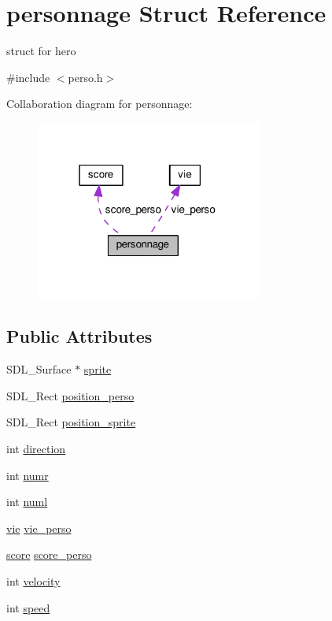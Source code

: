 \hypertarget{structpersonnage}{}\section{personnage Struct Reference}
\label{structpersonnage}


struct for hero  




{\ttfamily \#include $<$perso.\+h$>$}



Collaboration diagram for personnage\+:\nopagebreak
\begin{figure}[H]
\begin{center}
\leavevmode
\includegraphics[width=211pt]{structpersonnage__coll__graph}
\end{center}
\end{figure}
\subsection*{Public Attributes}
\begin{DoxyCompactItemize}
\item 
S\+D\+L\+\_\+\+Surface $\ast$ \hyperlink{structpersonnage_a8adbc94f4634e562d2499a96c9513102}{sprite}
\item 
S\+D\+L\+\_\+\+Rect \hyperlink{structpersonnage_a4a45c9e4310d819fcd3c9a60fc8c0ebf}{position\+\_\+perso}
\item 
S\+D\+L\+\_\+\+Rect \hyperlink{structpersonnage_a6f6ed0df27eb1c8f5238c4f8fea3cde9}{position\+\_\+sprite}
\item 
int \hyperlink{structpersonnage_a2664acffa6fccd8487b9e03b63fbd6da}{direction}
\item 
int \hyperlink{structpersonnage_a65b13e52d4bab27bc25e35de373fa865}{numr}
\item 
int \hyperlink{structpersonnage_acac339d614a7ac8e987bc94d547d9e18}{numl}
\item 
\hyperlink{structvie}{vie} \hyperlink{structpersonnage_ac96f4aee44111bc31a7718e5762bf483}{vie\+\_\+perso}
\item 
\hyperlink{structscore}{score} \hyperlink{structpersonnage_a7ea99b7d0c8445cb3d7ba6717eb89d8c}{score\+\_\+perso}
\item 
int \hyperlink{structpersonnage_aa10eda88d070839448f1c429dbbffdae}{velocity}
\item 
int \hyperlink{structpersonnage_acb8e0ece93e2c7c15a1672e2867edc19}{speed}
\end{DoxyCompactItemize}


